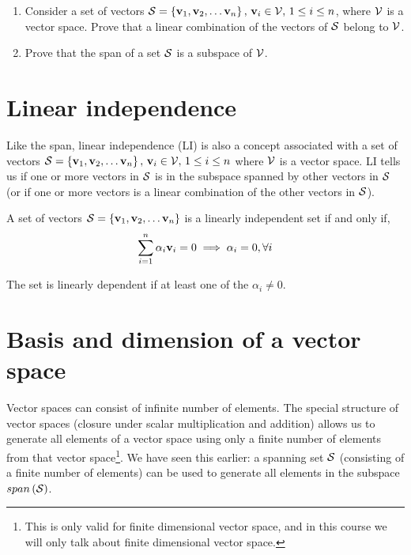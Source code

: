 \begin{problem*}[frametitle=Span of a set of vectors]
\begin{enumerate}
    \item Consider a set of vectors $\mathcal{S} = \left\{ \mathbf{v}_1, \mathbf{v}_2, \ldots \mathbf{v}_n\right\}, \, \mathbf{v}_i \in \mathcal{V}, \, 1 \leq i \leq n$, where $\mathcal{V}$ is a vector space. Prove that a linear combination of the vectors of $\mathcal{S}$ belong to $\mathcal{V}$.
    \item Prove that the span of a set $\mathcal{S}$ is a subspace of $\mathcal{V}$.
\end{enumerate}
\end{problem*}

\section{Linear independence}
Like the span, linear independence (LI) is also a concept associated with a set of vectors $\mathcal{S} = \left\{ \mathbf{v}_1, \mathbf{v}_2, \ldots \mathbf{v}_n\right\}, \, \mathbf{v}_i \in \mathcal{V}, \, 1 \leq i \leq n$ where $\mathcal{V}$ is a vector space. LI tells us if one or more vectors in $\mathcal{S}$ is in the subspace spanned by other vectors in $\mathcal{S}$ (or if one or more vectors is a linear combination of the other vectors in $\mathcal{S}$). 

\begin{definition}[frametitle=Linear Independene]
A set of vectors $\mathcal{S} = \left\{ \mathbf{v}_1, \mathbf{v}_2, \ldots \mathbf{v}_n\right\}$ is a linearly independent set if and only if,
\[ \sum_{i=1}^n \alpha_i\mathbf{v}_i = 0 \implies \alpha_i = 0, \forall i\]

\noindent The set is linearly dependent if at least one of the $\alpha_i \neq 0$. 
\end{definition}

\section{Basis and dimension of a vector space}
Vector spaces can consist of infinite number of elements. The special structure of vector spaces (closure under scalar multiplication and addition) allows us to generate all elements of a vector space using only a finite number of elements from that vector space\footnote{This is only valid for finite dimensional vector space, and in this course we will only talk about finite dimensional vector space.}. We have seen this earlier: a spanning set $\mathcal{S}$ (consisting of a finite number of elements) can be used to generate all elements in the subspace $span\left( \mathcal{S}\right)$. 

